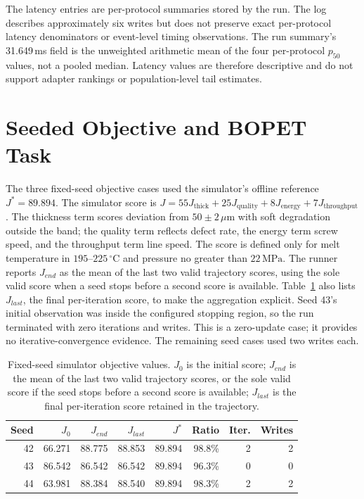 \documentclass[journal]{IEEEtran}
\begin{document}
The latency entries are per-protocol summaries stored by the run. The log
describes approximately six writes but does not preserve exact per-protocol
latency denominators or event-level timing observations. The run summary's
31.649\,ms field is the unweighted arithmetic mean of the four per-protocol
$p_{50}$ values, not a pooled median. Latency values are therefore descriptive
and do not support adapter rankings or population-level tail estimates.

\section{Seeded Objective and BOPET Task}
The three fixed-seed objective cases used the simulator's offline reference
$J^*=89.894$. The simulator score is
$J=55J_{\mathrm{thick}}+25J_{\mathrm{quality}}+8J_{\mathrm{energy}}+7J_{\mathrm{throughput}}$.
The thickness term scores deviation from $50\pm2\,\mu\mathrm{m}$ with soft
degradation outside the band; the quality term reflects defect rate, the
energy term screw speed, and the throughput term line speed. The score is
defined only for melt temperature in $195$--$225\,^{\circ}\mathrm{C}$ and
pressure no greater than $22\,\mathrm{MPa}$. The runner reports $J_{end}$ as
the mean of the last two valid
trajectory scores, using the sole valid score when a seed stops before a
second score is available. Table~\ref{tab:s6-seeds} also lists $J_{last}$,
the final per-iteration score, to make the aggregation explicit. Seed 43's
initial observation was inside the configured stopping region, so the run
terminated with zero iterations and writes. This is a zero-update case; it
provides no iterative-convergence evidence. The remaining seed cases used two writes
each.

\begin{table}[!t]
\centering
\caption{Fixed-seed simulator objective values. $J_0$ is the initial score;
$J_{end}$ is the mean of the last two valid trajectory scores, or the sole valid score if the seed stops
before a second score is available; $J_{last}$ is the final per-iteration
score retained in the trajectory.}
\label{tab:s6-seeds}
\footnotesize
\setlength{\tabcolsep}{3pt}
\begin{tabular}{@{}r r r r r r r r@{}}
\toprule
Seed & $J_0$ & $J_{end}$ & $J_{last}$ & $J^*$ & Ratio & Iter. & Writes\\
\midrule
42 & 66.271 & 88.775 & 88.853 & 89.894 & 98.8\% & 2 & 2\\
43 & 86.542 & 86.542 & 86.542 & 89.894 & 96.3\% & 0 & 0\\
44 & 63.981 & 88.384 & 88.540 & 89.894 & 98.3\% & 2 & 2\\
\bottomrule
\end{tabular}
\end{table}
\end{document}
